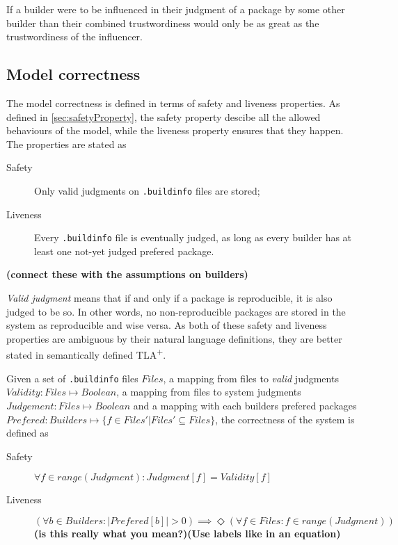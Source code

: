 If a builder were to be influenced in their judgment of a package by some other builder than their combined trustwordiness would only be as great as the trustwordiness of the influencer.

\subsection{Model correctness}
\label{sec:modelCorrectness}

The model correctness is defined in terms of safety and liveness properties. As defined in \ref{sec:safetyProperty}, the safety property descibe all the allowed behaviours of the model, while the liveness property ensures that they happen. The properties are stated as


\begin{description}
	\item[Safety] Only valid judgments on \texttt{.buildinfo} files are stored;
	\item[Liveness] Every \texttt{.buildinfo} file is eventually judged, as long as every builder has at least one not-yet judged prefered package.
\end{description}

\textbf{(connect these with the assumptions on builders)}

\textit{Valid judgment} means that if and only if a package is reproducible, it is also judged to be so. In other words, no non-reproducible packages are stored in the system as reproducible and wise versa. As both of these safety and liveness properties are ambiguous by their natural language definitions, they are better stated in semantically defined TLA\textsuperscript+.

Given a set of \texttt{.buildinfo} files $Files$, a mapping from files to \textit{valid} judgments $Validity: Files \mapsto Boolean$, a mapping from files to system judgments $Judgement: Files \mapsto Boolean$ and a mapping with each builders prefered packages $Prefered: Builders \mapsto \{f \in Files'| Files' \subseteq Files\}$, the correctness of the system is defined as

\begin{description}
	\item[Safety] $\forall f \in range(Judgment): Judgment[f] = Validity[f]$
	\item[Liveness] $(\forall b \in Builders: |Prefered[b]| > 0) \implies \Diamond(\forall f \in Files: f \in range(Judgment))$ \textbf{(is this really what you mean?)(Use labels like in an equation)}
\end{description}


